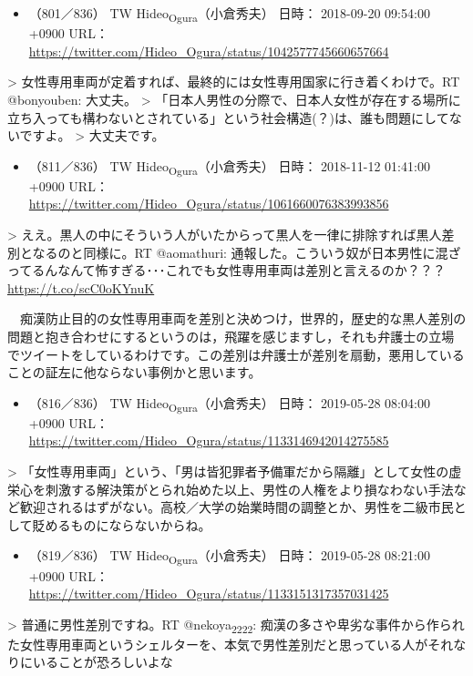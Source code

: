 \documentclass[]{ltjarticle}
\begin{document}
\begin{itemize}
\item （801／836） TW Hideo\textsubscript{Ogura}（小倉秀夫） 日時： 2018-09-20 09:54:00 +0900 URL： \url{https://twitter.com/Hideo\_Ogura/status/1042577745660657664}
\end{itemize}

> 女性専用車両が定着すれば、最終的には女性専用国家に行き着くわけで。RT @bonyouben: 大丈夫。
> 「日本人男性の分際で、日本人女性が存在する場所に立ち入っても構わないとされている」という社会構造(？)は、誰も問題にしてないですよ。
> 大丈夫です。

\begin{itemize}
\item （811／836） TW Hideo\textsubscript{Ogura}（小倉秀夫） 日時： 2018-11-12 01:41:00 +0900 URL： \url{https://twitter.com/Hideo\_Ogura/status/1061660076383993856}
\end{itemize}

> ええ。黒人の中にそういう人がいたからって黒人を一律に排除すれば黒人差別となるのと同様に。RT @aomathuri: 通報した。こういう奴が日本男性に混ざってるんなんて怖すぎる･･･これでも女性専用車両は差別と言えるのか？？？ \url{https://t.co/scC0oKYnuK}

　痴漢防止目的の女性専用車両を差別と決めつけ，世界的，歴史的な黒人差別の問題と抱き合わせにするというのは，飛躍を感じますし，それも弁護士の立場でツイートをしているわけです。この差別は弁護士が差別を扇動，悪用していることの証左に他ならない事例かと思います。

\begin{itemize}
\item （816／836） TW Hideo\textsubscript{Ogura}（小倉秀夫） 日時： 2019-05-28 08:04:00 +0900 URL： \url{https://twitter.com/Hideo\_Ogura/status/1133146942014275585}
\end{itemize}

> 「女性専用車両」という、「男は皆犯罪者予備軍だから隔離」として女性の虚栄心を刺激する解決策がとられ始めた以上、男性の人権をより損なわない手法など歓迎されるはずがない。高校／大学の始業時間の調整とか、男性を二級市民として貶めるものにならないからね。

\begin{itemize}
\item （819／836） TW Hideo\textsubscript{Ogura}（小倉秀夫） 日時： 2019-05-28 08:21:00 +0900 URL： \url{https://twitter.com/Hideo\_Ogura/status/1133151317357031425}
\end{itemize}

> 普通に男性差別ですね。RT @nekoya\textsubscript{2222}: 痴漢の多さや卑劣な事件から作られた女性専用車両というシェルターを、本気で男性差別だと思っている人がそれなりにいることが恐ろしいよな
\end{document}

